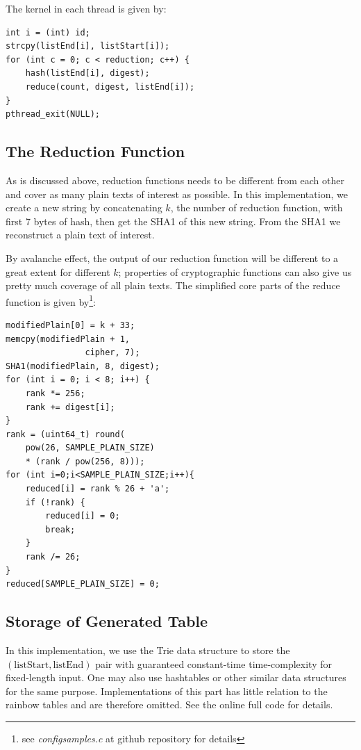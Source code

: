 \documentclass{article}
\begin{document}
\begin{multicols}{2}
The kernel in each thread is given by:

\begin{verbatim}
int i = (int) id;
strcpy(listEnd[i], listStart[i]);
for (int c = 0; c < reduction; c++) {
	hash(listEnd[i], digest);
	reduce(count, digest, listEnd[i]);
}
pthread_exit(NULL);
\end{verbatim}

\subsection{The Reduction Function}
As is discussed above, reduction functions needs to be different from each other and cover as many plain texts of interest as possible. In this implementation, we create a new string by concatenating $k$, the number of reduction function, with first 7 bytes of hash, then get the SHA1 of this new string. From the SHA1 we reconstruct a plain text of interest.

By avalanche effect\cite{wiki:avalanche}, the output of our reduction function will be different to a great extent for different $k$; properties of cryptographic functions can also give us pretty much coverage of all plain texts. The simplified core parts of the reduce function is given by\footnote{see \textit{configsamples.c} at github repository for details}:
\begin{verbatim}
modifiedPlain[0] = k + 33;
memcpy(modifiedPlain + 1, 
				cipher, 7);
SHA1(modifiedPlain, 8, digest);
for (int i = 0; i < 8; i++) {
	rank *= 256;
	rank += digest[i];
}
rank = (uint64_t) round(
	pow(26, SAMPLE_PLAIN_SIZE) 
	* (rank / pow(256, 8)));
for (int i=0;i<SAMPLE_PLAIN_SIZE;i++){
	reduced[i] = rank % 26 + 'a';
	if (!rank) {
		reduced[i] = 0;
		break;
	}
	rank /= 26;
}
reduced[SAMPLE_PLAIN_SIZE] = 0;
\end{verbatim}

\subsection{Storage of Generated Table}
In this implementation, we use the Trie data structure to store the $(\text{listStart}, \text{listEnd})$ pair with guaranteed constant-time time-complexity for fixed-length input. One may also use hashtables or other similar data structures for the same purpose. Implementations of this part has little relation to the rainbow tables and are therefore omitted. See the online full code for details.


\end{multicols}
\end{document}
